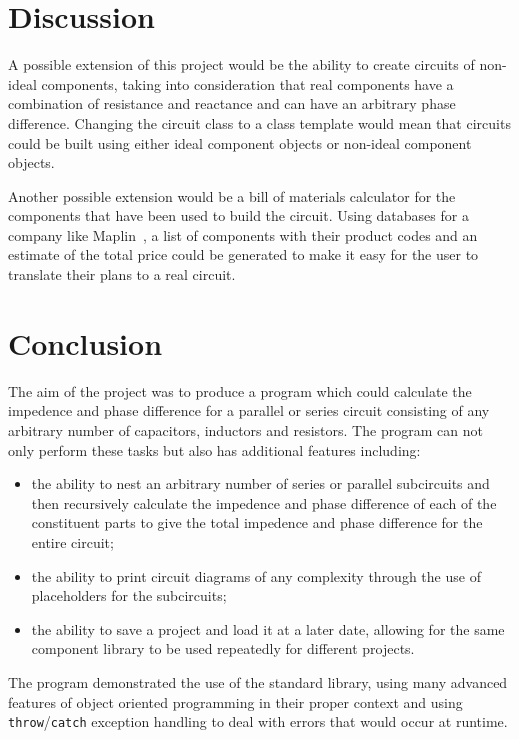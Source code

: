 \section{Discussion}
\label{sec:discussion}
A possible extension of this project would be the ability to create circuits of non-ideal components, taking into consideration that real components have a combination of resistance and reactance and can have an arbitrary phase difference. Changing the circuit class to a class template would mean that circuits could be built using either ideal component objects or non-ideal component objects.

Another possible extension would be a bill of materials calculator for the components that have been used to build the circuit. Using databases for a company like Maplin~\cite{ref:maplin}, a list of components with their product codes and an estimate of the total price could be generated to make it easy for the user to translate their plans to a real circuit.


\section{Conclusion}
The aim of the project was to produce a program which could calculate the impedence and phase difference for a parallel or series circuit consisting of any arbitrary number of capacitors, inductors and resistors. The program can not only perform these tasks but also has additional features including:
\begin{itemize}
  \item the ability to nest an arbitrary number of series or parallel subcircuits and then recursively calculate the impedence and phase difference of each of the constituent parts to give the total impedence and phase difference for the entire circuit;
  \item the ability to print circuit diagrams of any complexity through the use of placeholders for the subcircuits;
  \item the ability to save a project and load it at a later date, allowing for the same component library to be used repeatedly for different projects.
\end{itemize}
The program demonstrated the use of the  standard library, using many advanced features of object oriented programming in their proper context and using \verb!throw!/\verb!catch! exception handling to deal with errors that would occur at runtime.
